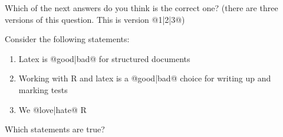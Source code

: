 \documentclass[10pt]{examdesign}
\begin{document}
\begin{multiplechoice}[resetcounter=no,  examcolumns=1]
\begin{question}
    
    
    \end{question}
    
    
    \begin{question}
    
        Which of the next answers do you think is the correct one? (there are three versions of this question. This is version @{1}|{2}|{3}@)
    
    
    
    
    
    
    \end{question}
    
    
    \begin{question}
    
        Consider the following statements:
    
        \begin{enumerate}[I]
            \item Latex is @{good}|{bad}@ for structured documents
    
            \item Working with R and latex is a @{good}|{bad}@ choice for writing up and marking tests
    
            \item We @{love}|{hate}@ R
    
        \end{enumerate}
    
        Which statements are true?
    
    
    \end{question}
    
    
    \end{multiplechoice}
    
    
    
\end{document}
